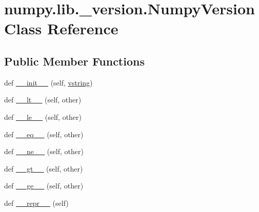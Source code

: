\hypertarget{classnumpy_1_1lib_1_1__version_1_1NumpyVersion}{}\section{numpy.\+lib.\+\_\+version.\+Numpy\+Version Class Reference}
\label{classnumpy_1_1lib_1_1__version_1_1NumpyVersion}
\subsection*{Public Member Functions}
\begin{DoxyCompactItemize}
\item 
def \hyperlink{classnumpy_1_1lib_1_1__version_1_1NumpyVersion_ac2ad5534ed311912873f15b120686e5a}{\+\_\+\+\_\+init\+\_\+\+\_\+} (self, \hyperlink{classnumpy_1_1lib_1_1__version_1_1NumpyVersion_a042f75c1c65f7a901b91cae401bb61b4}{vstring})
\item 
def \hyperlink{classnumpy_1_1lib_1_1__version_1_1NumpyVersion_a838bdd760dad16a7c9dc458e82c360f4}{\+\_\+\+\_\+lt\+\_\+\+\_\+} (self, other)
\item 
def \hyperlink{classnumpy_1_1lib_1_1__version_1_1NumpyVersion_abf3c7369e3491247fd701483a2cb6e80}{\+\_\+\+\_\+le\+\_\+\+\_\+} (self, other)
\item 
def \hyperlink{classnumpy_1_1lib_1_1__version_1_1NumpyVersion_a13a4270377a763ddcfdc04a7a4f38f42}{\+\_\+\+\_\+eq\+\_\+\+\_\+} (self, other)
\item 
def \hyperlink{classnumpy_1_1lib_1_1__version_1_1NumpyVersion_a8d697430147771cb0bc9d006750228f7}{\+\_\+\+\_\+ne\+\_\+\+\_\+} (self, other)
\item 
def \hyperlink{classnumpy_1_1lib_1_1__version_1_1NumpyVersion_a9c3d527eb2425ae1c51bb471591b14c2}{\+\_\+\+\_\+gt\+\_\+\+\_\+} (self, other)
\item 
def \hyperlink{classnumpy_1_1lib_1_1__version_1_1NumpyVersion_a8e5b6b3b7f0aa159d8ee9930912b9f3c}{\+\_\+\+\_\+ge\+\_\+\+\_\+} (self, other)
\item 
def \hyperlink{classnumpy_1_1lib_1_1__version_1_1NumpyVersion_acd042dc0e5db49fc6f942c032908f3db}{\+\_\+\+\_\+repr\+\_\+\+\_\+} (self)
\end{DoxyCompactItemize}
